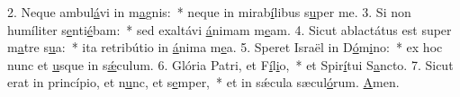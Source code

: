 2. Neque ambul\uline{á}vi in m\uline{a}gnis:~* neque in mirab\uline{í}libus s\uline{u}per me.
3. Si non humíliter s\uline{e}nti\uline{é}bam:~* sed exaltávi \uline{á}nimam m\uline{e}am.
4. Sicut ablactátus est super m\uline{a}tre s\uline{u}a:~* ita retribútio in \uline{á}nima m\uline{e}a.
5. Speret Israël in D\uline{ó}m\uline{i}no:~* ex hoc nunc et \uline{u}sque in s\uline{ǽ}culum.
6. Glória Patri, et F\uline{í}l\uline{i}o,~* et Spir\uline{í}tui S\uline{a}ncto.
7. Sicut erat in princípio, et n\uline{u}nc, et s\uline{e}mper,~* et in sǽcula sæcul\uline{ó}rum. \uline{A}men.
